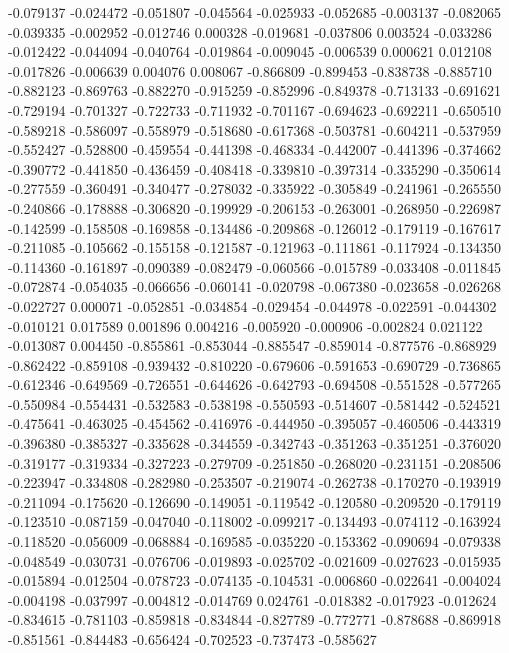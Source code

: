 -0.079137
-0.024472
-0.051807
-0.045564
-0.025933
-0.052685
-0.003137
-0.082065
-0.039335
-0.002952
-0.012746
0.000328
-0.019681
-0.037806
0.003524
-0.033286
-0.012422
-0.044094
-0.040764
-0.019864
-0.009045
-0.006539
0.000621
0.012108
-0.017826
-0.006639
0.004076
0.008067
-0.866809
-0.899453
-0.838738
-0.885710
-0.882123
-0.869763
-0.882270
-0.915259
-0.852996
-0.849378
-0.713133
-0.691621
-0.729194
-0.701327
-0.722733
-0.711932
-0.701167
-0.694623
-0.692211
-0.650510
-0.589218
-0.586097
-0.558979
-0.518680
-0.617368
-0.503781
-0.604211
-0.537959
-0.552427
-0.528800
-0.459554
-0.441398
-0.468334
-0.442007
-0.441396
-0.374662
-0.390772
-0.441850
-0.436459
-0.408418
-0.339810
-0.397314
-0.335290
-0.350614
-0.277559
-0.360491
-0.340477
-0.278032
-0.335922
-0.305849
-0.241961
-0.265550
-0.240866
-0.178888
-0.306820
-0.199929
-0.206153
-0.263001
-0.268950
-0.226987
-0.142599
-0.158508
-0.169858
-0.134486
-0.209868
-0.126012
-0.179119
-0.167617
-0.211085
-0.105662
-0.155158
-0.121587
-0.121963
-0.111861
-0.117924
-0.134350
-0.114360
-0.161897
-0.090389
-0.082479
-0.060566
-0.015789
-0.033408
-0.011845
-0.072874
-0.054035
-0.066656
-0.060141
-0.020798
-0.067380
-0.023658
-0.026268
-0.022727
0.000071
-0.052851
-0.034854
-0.029454
-0.044978
-0.022591
-0.044302
-0.010121
0.017589
0.001896
0.004216
-0.005920
-0.000906
-0.002824
0.021122
-0.013087
0.004450
-0.855861
-0.853044
-0.885547
-0.859014
-0.877576
-0.868929
-0.862422
-0.859108
-0.939432
-0.810220
-0.679606
-0.591653
-0.690729
-0.736865
-0.612346
-0.649569
-0.726551
-0.644626
-0.642793
-0.694508
-0.551528
-0.577265
-0.550984
-0.554431
-0.532583
-0.538198
-0.550593
-0.514607
-0.581442
-0.524521
-0.475641
-0.463025
-0.454562
-0.416976
-0.444950
-0.395057
-0.460506
-0.443319
-0.396380
-0.385327
-0.335628
-0.344559
-0.342743
-0.351263
-0.351251
-0.376020
-0.319177
-0.319334
-0.327223
-0.279709
-0.251850
-0.268020
-0.231151
-0.208506
-0.223947
-0.334808
-0.282980
-0.253507
-0.219074
-0.262738
-0.170270
-0.193919
-0.211094
-0.175620
-0.126690
-0.149051
-0.119542
-0.120580
-0.209520
-0.179119
-0.123510
-0.087159
-0.047040
-0.118002
-0.099217
-0.134493
-0.074112
-0.163924
-0.118520
-0.056009
-0.068884
-0.169585
-0.035220
-0.153362
-0.090694
-0.079338
-0.048549
-0.030731
-0.076706
-0.019893
-0.025702
-0.021609
-0.027623
-0.015935
-0.015894
-0.012504
-0.078723
-0.074135
-0.104531
-0.006860
-0.022641
-0.004024
-0.004198
-0.037997
-0.004812
-0.014769
0.024761
-0.018382
-0.017923
-0.012624
-0.834615
-0.781103
-0.859818
-0.834844
-0.827789
-0.772771
-0.878688
-0.869918
-0.851561
-0.844483
-0.656424
-0.702523
-0.737473
-0.585627
